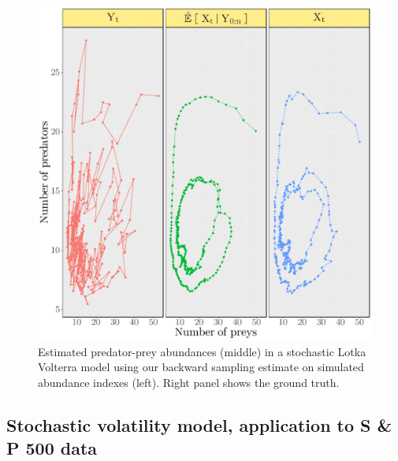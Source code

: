 \documentclass[12pt]{article}
\begin{document}
\begin{figure}
\begin{center}
\includegraphics[scale = .4]{Figure8.pdf}
\end{center}
\caption{\label{fig:LV:tracking} Estimated predator-prey abundances (middle) in a stochastic Lotka Volterra model using our backward sampling estimate on simulated abundance indexes (left). Right panel shows the ground truth.}
\end{figure}

\subsection*{Stochastic volatility model, application to S \& P 500 data}
\label{sec:simu:sv}
\end{document}

